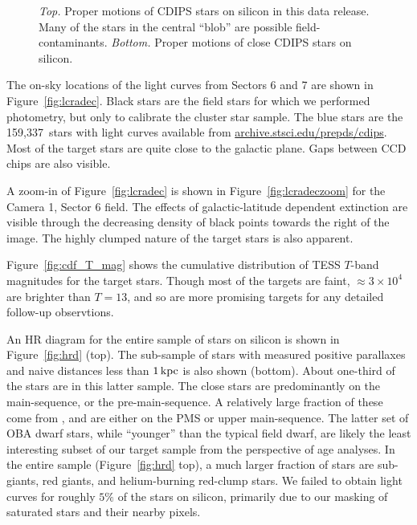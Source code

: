 \documentclass[12pt,twocolumn,tighten]{aastex62}
\newcommand{\numberlcs}{159{,}337\ } %
\newcommand{\stscilink} {\url{archive.stsci.edu/prepds/cdips}}
\begin{document}
\begin{figure}[!t]
	\vspace{-0.8cm}
	\vspace{-0.8cm}
	\caption{
    {\it Top.} Proper motions of CDIPS stars on silicon in this
    data release.  Many of the stars in the central ``blob'' are possible
    field-contaminants.
    {\it Bottom.} Proper motions of close CDIPS stars
    on silicon.
	}
	\label{fig:propermotions}
\end{figure}

The on-sky locations of the light curves from Sectors 6 and 7
are shown in Figure~\ref{fig:lcradec}.
Black stars are the field stars for which we performed photometry,
but only to calibrate the cluster star sample.
The blue stars are the \numberlcs stars with light curves available
from \stscilink.
Most of the target stars are quite close to the galactic plane.
Gaps between CCD chips are also visible.

A zoom-in of Figure~\ref{fig:lcradec} is shown in Figure~\ref{fig:lcradeczoom}
for the Camera 1, Sector 6 field. The effects of galactic-latitude
dependent extinction are visible through the decreasing density of black
points towards the right of the image.
The highly clumped nature of the target stars is also apparent.

Figure~\ref{fig:cdf_T_mag} shows the cumulative distribution of
TESS $T$-band magnitudes for the target stars.
Though most of the targets are faint, $\approx3\times10^4$ are
brighter than $T=13$, and so are more promising targets for any
detailed follow-up observtions.

An HR diagram for the entire sample of stars on silicon
is shown in Figure~\ref{fig:hrd} (top).
The sub-sample of stars with
measured positive parallaxes and naive distances less than
$1\,{\rm kpc}$ is also shown (bottom).
About one-third of the stars are in this latter sample.
The close stars are predominantly on the main-sequence, or the pre-main-sequence.
A relatively large fraction of these come from \citet{zari_3d_2018},
and are either on the PMS or upper main-sequence.
The latter set of OBA dwarf stars, while ``younger'' than the typical
field dwarf, are likely the least interesting subset of our target sample
from the perspective of age analyses.
In the entire sample (Figure~\ref{fig:hrd} top), a much larger fraction of stars are sub-giants,
red giants, and helium-burning red-clump stars.
We failed to obtain light curves for roughly $5\%$ of the stars on silicon, 
primarily due to our masking of saturated stars and their nearby pixels.
\end{document}
